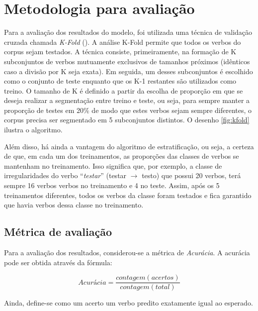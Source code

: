 \section{Metodologia para avaliação}
\label{sec:method}

 Para a avaliação dos resultados do modelo, foi utilizada uma técnica de validação cruzada chamada \textit{K-Fold} (\cite{kfold:2018}). A análise K-Fold permite que todos os verbos do corpus sejam testados. A técnica consiste, primeiramente, na formação de K subconjuntos de verbos mutuamente exclusivos de tamanhos próximos (idênticos caso a divisão por K seja exata). Em seguida, um desses subconjuntos é escolhido como o conjunto de teste enquanto que os K-1 restantes são utilizados como treino. O tamanho de K é definido a partir da escolha de proporção em que se deseja realizar a segmentação entre treino e teste, ou seja, para sempre manter a proporção de testes em 20\% de modo que estes verbos sejam sempre diferentes, o corpus precisa ser segmentado em 5 subconjuntos distintos. O desenho \ref{fig:kfold} ilustra o algoritmo. 



Além disso, há ainda a vantagem do algoritmo de estratificação, ou seja, a certeza de que, em cada um dos treinamentos, as proporções das classes de verbos se mantenham no treinamento. Isso significa que, por exemplo, a classe de irregularidades do verbo “\textit{testar}” (testar $\rightarrow$ testo) que possui 20 verbos, terá sempre 16 verbos verbos no treinamento e 4 no teste. Assim, após os 5 treinamentos diferentes, todos os verbos da classe foram testados e fica garantido que havia verbos dessa classe no treinamento.

\subsection{Métrica de avaliação}

Para a avaliação dos resultados, considerou-se a métrica de \textit{Acurácia}. A acurácia pode ser obtida através da fórmula:

\begin{equation}
    Acurácia = \frac{contagem(acertos)}{contagem(total)}
\end{equation}

Ainda, define-se como um acerto um verbo predito exatamente igual ao esperado.

